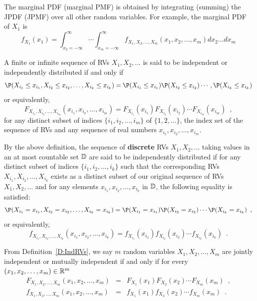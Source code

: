 The marginal PDF (marginal PMF) is obtained by integrating (summing) the JPDF (JPMF) over all other random variables.  
For example, the marginal PDF of $X_1$ is
\[
f_{X_1}(x_1) =
\int_{x_2=-\infty}^{\infty}\cdots \int_{x_m=-\infty}^{\infty} f_{X_1,X_2,\ldots,X_m}(x_1,x_2,\ldots,x_m) dx_2\ldots d x_m 
\]

\begin{definition}\label{D:IndRVs}
A finite or infinite sequence of RVs $X_1,X_2,\ldots$ is said to be independent or independently distributed if and only if
\[
\P(X_{i_1} \leq x_{i_1}, X_{i_2} \leq x_{i_2}, \ldots,  X_{i_k} \leq x_{i_k} ) = \P(X_{i_1} \leq x_{i_1}) \P(X_{i_2} \leq x_{i_2}) \cdots,  \P(X_{i_k} \leq x_{i_k} )
\]
or equivalently,
\[
F_{X_{i_1},X_{i_2},\ldots,X_{i_m}}(x_{i_1},x_{i_2},\ldots,x_{i_m}) = F_{X_{i_1}}(x_{i_1}) F_{X_{i_2}}(x_{i_2}) \cdots F_{X_{i_m}}(x_{i_m}) \enspace ,
\]
for any distinct subset of indices $\{i_1,i_2,\ldots,i_m\}$ of $\{1,2,\ldots\}$, the index set of the sequence of RVs and any sequence of real numbers $x_{i_1},x_{i_2},\ldots,x_{i_m}$.

By the above definition, the sequence of {\bf discrete} RVs $X_1,X_2,\ldots$ taking values in an at most countable set $\mathbb{D}$ are said to be independently distributed if for any distinct subset of indices $\{i_1,i_2,\ldots,i_k\}$ such that the corresponding RVs $X_{i_1},X_{i_2},\ldots,X_{i_k}$ exists as a distinct subset of our original sequence of RVs $X_1,X_2,\ldots$ and for any elements $x_{i_1}, x_{i_2},\ldots,x_{i_k}$ in $\mathbb{D}$, the following equality is satisfied:
\[
\P(X_{i_1}= x_{i_1}, X_{i_2} = x_{i_2}, \ldots,  X_{i_k} = x_{i_k} ) = \P(X_{i_1} = x_{i_1}) \P(X_{i_2} = x_{i_2}) \cdots  \P(X_{i_k} = x_{i_k}) \enspace ,
\]
or equivalently,
\[
f_{X_{i_1}, X_{i_2},\ldots,X_{i_k}} (x_{i_1}, x_{i_2}, \ldots,  x_{i_k} ) = f_{X_{i_1}} (x_{i_1}) f_{X_{i_2}}(x_{i_2}) \cdots  f_{X_{i_k}} (x_{i_k}) \enspace .
\]
\end{definition}

From Definition~\ref{D:IndRVs}, we say $m$ random variables $X_1,X_2,\ldots,X_m$ are jointly independent or mutually independent if and only if for every $(x_1,x_2,\ldots,x_m) \in \mathbb{R}^m$
\begin{eqnarray}
F_{X_{1},X_{2},\ldots,X_{m}}(x_{1},x_{2},\ldots,x_{m}) &=& F_{X_{1}}(x_{1}) F_{X_{2}}(x_{2}) \cdots F_{X_{m}}(x_{m}) \enspace ,\\
f_{X_{1},X_{2},\ldots,X_{m}}(x_{1},x_{2},\ldots,x_{m}) &=& f_{X_{1}}(x_{1}) f_{X_{2}}(x_{2}) \cdots f_{X_{m}}(x_{m}) \enspace .
\end{eqnarray}

